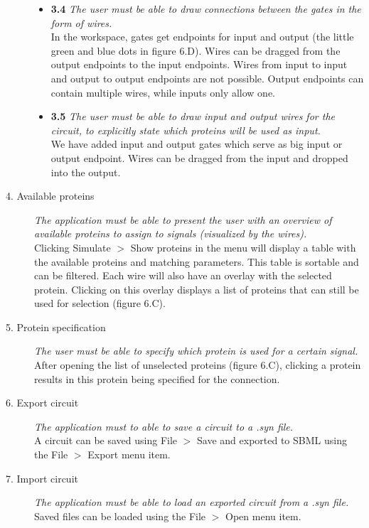 \documentclass[a4paper]{article}
\begin{document}
\begin{description}
\begin{itemize}
	\item \textbf{3.4} \textit{The user must be able to draw connections between the gates in the form of wires.}\\
	In the workspace, gates get endpoints for input and output (the little green and blue dots in figure 6.D). Wires can be dragged from the output endpoints to the input endpoints. Wires from input to input and output to output endpoints are not possible. Output endpoints can contain multiple wires, while inputs only allow one.

	\item \textbf{3.5} \textit{The user must be able to draw input and output wires for the circuit, to explicitly state which proteins will be used as input.}\\
	We have added input and output gates which serve as big input or output endpoint. Wires can be dragged from the input and dropped into the output.

	\end{itemize}
\item[4. Available proteins] \textit{The application must be able to present the user with an overview of available proteins to assign to signals (visualized by the wires).}\\
Clicking Simulate $>$ Show proteins in the menu will display a table with the available proteins and matching parameters. This table is sortable and can be filtered. Each wire will also have an overlay with the selected protein. Clicking on this overlay displays a list of proteins that can still be used for selection (figure 6.C).

\item[5. Protein specification] \textit{The user must be able to specify which protein is used for a certain signal.}\\
After opening the list of unselected proteins (figure 6.C), clicking a protein results in this protein being specified for the connection.

\item[6. Export circuit] \textit{The application must to able to save a circuit to a .syn file.}\\
A circuit can be saved using File $>$ Save and exported to SBML using the File $>$ Export menu item.

\item[7. Import circuit] \textit{The application must be able to load an exported circuit from a .syn file.}\\
Saved files can be loaded using the File $>$ Open menu item.


\end{description}
\end{document}
